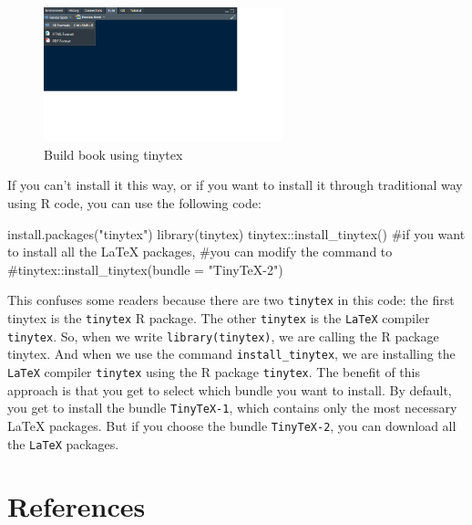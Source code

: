 \documentclass[
  letterpaper,
  paper =a4,
  twoside,
  openright,
  headsepline,
  footsepline,
  listof = totocnumbered,
  chapterprefix = true,
  firstiscover]{scrbook}
\newenvironment{Shaded}{\begin{snugshade}}{\end{snugshade}}
\newcommand{\CommentTok}[1]{\textcolor[rgb]{0.37,0.37,0.37}{#1}}
\newcommand{\FunctionTok}[1]{\textcolor[rgb]{0.28,0.35,0.67}{#1}}
\newcommand{\NormalTok}[1]{\textcolor[rgb]{0.00,0.23,0.31}{#1}}
\newcommand{\SpecialCharTok}[1]{\textcolor[rgb]{0.37,0.37,0.37}{#1}}
\newcommand{\StringTok}[1]{\textcolor[rgb]{0.13,0.47,0.30}{#1}}
\begin{document}
\begin{figure}[H]

{\centering \includegraphics[width=2.73in,height=\textheight]{images/build-book.png}

}

\caption{\label{fig-build-book}Build book using tinytex}

\end{figure}

If you can't install it this way, or if you want to install it through
traditional way using R code, you can use the following code:

\begin{Shaded}
\begin{Highlighting}[numbers=left,,]
\FunctionTok{install.packages}\NormalTok{(}\StringTok{"tinytex"}\NormalTok{)}
\FunctionTok{library}\NormalTok{(tinytex)}
\NormalTok{tinytex}\SpecialCharTok{::}\FunctionTok{install\_tinytex}\NormalTok{()}
\CommentTok{\#if you want to install all the LaTeX packages, }
\CommentTok{\#you can modify the command to }
\CommentTok{\#tinytex::install\_tinytex(bundle = "TinyTeX{-}2")}
\end{Highlighting}
\end{Shaded}

This confuses some readers because there are two \texttt{tinytex} in
this code: the first tinytex is the \texttt{tinytex} R package. The
other \texttt{tinytex} is the \texttt{LaTeX} compiler \texttt{tinytex}.
So, when we write \texttt{library(tinytex)}, we are calling the R
package tinytex. And when we use the command \texttt{install\_tinytex},
we are installing the \texttt{LaTeX} compiler \texttt{tinytex} using the
R package \texttt{tinytex}. The benefit of this approach is that you get
to select which bundle you want to install. By default, you get to
install the bundle \texttt{TinyTeX-1}, which contains only the most
necessary LaTeX packages. But if you choose the bundle
\texttt{TinyTeX-2}, you can download all the \texttt{LaTeX} packages.

\hypertarget{references}{%
\chapter*{References}\label{references}}
\end{document}
